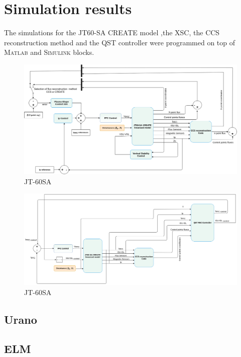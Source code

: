 \section{Simulation results}	

 The simulations for  the JT60-SA CREATE model ,the XSC, the CCS reconstruction method and the QST controller  were programmed on top of  \textsc{Matlab} and \textsc{Simulink} blocks.
 
 
\begin{figure}
	\centering
	\includegraphics[width=1.05\textwidth]{Chp3/JT60Schemes1.png}
	\caption{	\label{JT60controlscheme}JT-60SA }
\end{figure}

\begin{figure}
	\centering
	\includegraphics[width=1\textwidth]{Chp3/JT60SchemeFBC.png}
	\caption{	\label{JT60FBCcheme}JT-60SA }
\end{figure}



\subsection{Urano}
\subsection{ELM}
